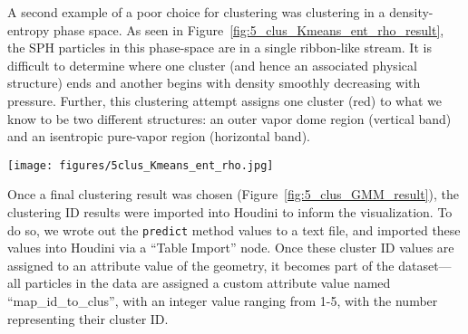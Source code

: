 \documentclass[fleqn,usenatbib,useAMS]{mnras}
\begin{document}
%
A second example of a poor choice for clustering was clustering in a density-entropy phase space. As seen in Figure~\ref{fig:5_clus_Kmeans_ent_rho_result}, the SPH particles in this phase-space are in a single ribbon-like stream. It is difficult to determine where one cluster (and hence an associated physical structure) ends and another begins with density smoothly decreasing with pressure. Further, this clustering attempt assigns one cluster (red) to what we know to be two different structures: an outer vapor dome region (vertical band) and an isentropic pure-vapor region (horizontal band). \par
%
\begin{figure*}
\centering
\texttt{[image: figures/5clus\_Kmeans\_ent\_rho.jpg]}
\caption{As Figure~\ref{fig:5_clus_Kmeans_result}, but with the Kmeans clustering performed in a scaled density-entropy phase-space instead of a scaled temperature-entropy phase-space. This is also an example of a poor phase-space choice because most of the data is in one streamlined band, and it is difficult to determine where one cluster begins and another ends. Also, one cluster (red) incorrectly groups together two known significant structures: a vapor dome region (red vertical band), and an isentropic pure-vapor region (red horizontal band).}
\label{fig:5_clus_Kmeans_ent_rho_result}
\end{figure*}
%
Once a final clustering result was chosen (Figure~\ref{fig:5_clus_GMM_result}), the clustering ID results were imported into Houdini to inform the visualization. To do so, we wrote out the \texttt{predict} method values to a text file, and imported these values into Houdini via a ``Table Import'' node. Once these cluster ID values are assigned to an attribute value of the geometry, it becomes part of the dataset---all particles in the data are assigned a custom attribute value named ``map\_id\_to\_clus'', with an integer value ranging from 1-5, with the number representing their cluster ID. \par
\end{document}
